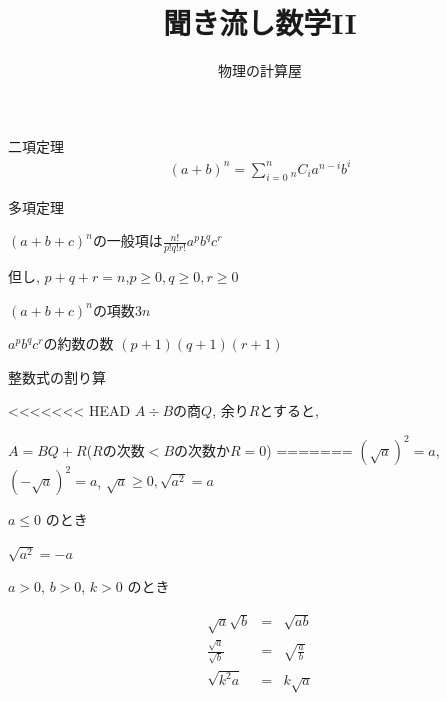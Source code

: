 \documentclass[aspectratio=169, 12pt]{beamer} %
\begin{document}
\title{聞き流し数学I\hspace{-1.2pt}I}
\author[物理の計算屋]{物理の計算屋}
\date{}
\frame{\maketitle} %
\begin{frame}{二項定理}
    \begin{eqnarray*}
        (a+b)^n=\sum_{i=0}^n {}_nC_i a^{n-i}b^i
    \end{eqnarray*}
\end{frame}
\begin{frame}{多項定理}
    \begin{center}
        $(a+b+c)^n$の一般項は$\frac{n!}{p!q!r!}a^pb^qc^r$ \par
        但し, $p+q+r=n$,\space$p\geq0, q\geq0, r\geq0$
    \end{center}
    \begin{center}
        $(a+b+c)^n$の項数$3n$ \par
        $a^pb^qc^r$の約数の数 $(p+1)(q+1)(r+1)$
    \end{center}
\end{frame}
\begin{frame}{整数式の割り算}
    \begin{center}
<<<<<<< HEAD
        $A \div B$の商$Q$, 余り$R$とすると, \par
        $A=BQ+R$\space ($R$の次数\space$<B$の次数\space か\space$R=0$)
=======
        $(\sqrt{a})^2=a$, $(-\sqrt{a})^2=a$, $\sqrt{a}\geq 0, \sqrt{a^2}=a$
    \end{center}
    $ a \leq 0 $ のとき \par
    \begin{center}
        $\sqrt{a^2}=-a$
    \end{center}
    $ a > 0$, $b>0$, $k>0$ のとき \par
    \begin{eqnarray*}
        \sqrt{a}\sqrt{b}&=&\sqrt{ab} \\
        \frac{\sqrt{a}}{\sqrt{b}}&=&\sqrt{\frac{a}{b}} \\
        \sqrt{k^2a}&=&k\sqrt{a}
    \end{eqnarray*}
\end{frame}
\end{document}
